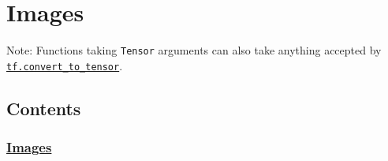 


\section{Images }\label{images}

Note: Functions taking \texttt{Tensor} arguments can also take anything
accepted by
\href{../../api_docs/python/framework.md\#convert_to_tensor}{\texttt{tf.convert\_to\_tensor}}.

\subsection{Contents}\label{contents}

\subsubsection{\texorpdfstring{\protect\hyperlink{AUTOGENERATED-images}{Images}}{Images}}\label{images-1}

